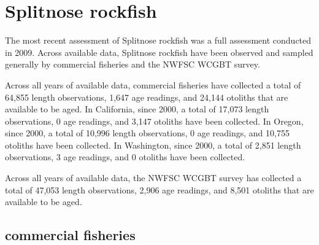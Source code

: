 \documentclass[11pt,
  english,
  letterpaper,
]{article}
\begin{document}
\hypertarget{splitnose-rockfish}{%
\section{Splitnose rockfish}\label{splitnose-rockfish}}

\leavevmode\tagmcend\tagstructend


The most recent assessment of Splitnose rockfish was a full assessment conducted in 2009. Across available data, Splitnose rockfish have been observed and sampled generally by commercial fisheries and the NWFSC WCGBT survey.

\leavevmode\tagmcend\tagstructend\par


Across all years of available data, commercial fisheries have collected a total of 64,855 length observations, 1,647 age readings, and 24,144 otoliths that are available to be aged. In California, since 2000, a total of 17,073 length observations, 0 age readings, and 3,147 otoliths have been collected. In Oregon, since 2000, a total of 10,996 length observations, 0 age readings, and 10,755 otoliths have been collected. In Washington, since 2000, a total of 2,851 length observations, 3 age readings, and 0 otoliths have been collected.

\leavevmode\tagmcend\tagstructend\par


Across all years of available data, the NWFSC WCGBT survey has collected a total of 47,053 length observations, 2,906 age readings, and 8,501 otoliths that are available to be aged.

\leavevmode\tagmcend\tagstructend\par


\hypertarget{commercial-fisheries-51}{%
\subsection{commercial fisheries}\label{commercial-fisheries-51}}

\leavevmode\tagmcend\tagstructend


\begingroup\fontsize{10}{12}\selectfont \begingroup\fontsize{10}{12}\selectfont
\end{document}
